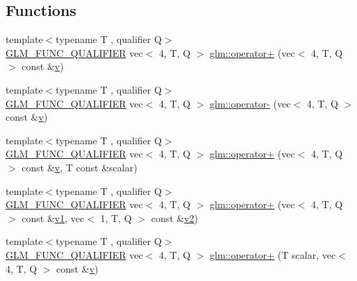 \subsection*{Functions}
\begin{DoxyCompactItemize}
\item 
{\footnotesize template$<$typename T , qualifier Q$>$ }\\\mbox{\hyperlink{setup_8hpp_a33fdea6f91c5f834105f7415e2a64407}{G\+L\+M\+\_\+\+F\+U\+N\+C\+\_\+\+Q\+U\+A\+L\+I\+F\+I\+ER}} vec$<$ 4, T, Q $>$ \mbox{\hyperlink{namespaceglm_ad4cb4de6123a192b6beac6bc1e2975d7}{glm\+::operator+}} (vec$<$ 4, T, Q $>$ const \&\mbox{\hyperlink{_s_d_l__opengl_8h_a10a82eabcb59d2fcd74acee063775f90}{v}})
\item 
{\footnotesize template$<$typename T , qualifier Q$>$ }\\\mbox{\hyperlink{setup_8hpp_a33fdea6f91c5f834105f7415e2a64407}{G\+L\+M\+\_\+\+F\+U\+N\+C\+\_\+\+Q\+U\+A\+L\+I\+F\+I\+ER}} vec$<$ 4, T, Q $>$ \mbox{\hyperlink{namespaceglm_a36a5075ce4b0b56798c9d28371a1422c}{glm\+::operator-\/}} (vec$<$ 4, T, Q $>$ const \&\mbox{\hyperlink{_s_d_l__opengl_8h_a10a82eabcb59d2fcd74acee063775f90}{v}})
\item 
{\footnotesize template$<$typename T , qualifier Q$>$ }\\\mbox{\hyperlink{setup_8hpp_a33fdea6f91c5f834105f7415e2a64407}{G\+L\+M\+\_\+\+F\+U\+N\+C\+\_\+\+Q\+U\+A\+L\+I\+F\+I\+ER}} vec$<$ 4, T, Q $>$ \mbox{\hyperlink{namespaceglm_a6181e788037278d6fd7f179ce6539551}{glm\+::operator+}} (vec$<$ 4, T, Q $>$ const \&\mbox{\hyperlink{_s_d_l__opengl_8h_a10a82eabcb59d2fcd74acee063775f90}{v}}, T const \&scalar)
\item 
{\footnotesize template$<$typename T , qualifier Q$>$ }\\\mbox{\hyperlink{setup_8hpp_a33fdea6f91c5f834105f7415e2a64407}{G\+L\+M\+\_\+\+F\+U\+N\+C\+\_\+\+Q\+U\+A\+L\+I\+F\+I\+ER}} vec$<$ 4, T, Q $>$ \mbox{\hyperlink{namespaceglm_af3516907770d4916d392ac513c906c4d}{glm\+::operator+}} (vec$<$ 4, T, Q $>$ const \&\mbox{\hyperlink{_s_d_l__opengl__glext_8h_a435c176a02c061b43e19bdf7c86cceae}{v1}}, vec$<$ 1, T, Q $>$ const \&\mbox{\hyperlink{_s_d_l__opengl__glext_8h_a0928f6d0f0f794ba000a21dfae422136}{v2}})
\item 
{\footnotesize template$<$typename T , qualifier Q$>$ }\\\mbox{\hyperlink{setup_8hpp_a33fdea6f91c5f834105f7415e2a64407}{G\+L\+M\+\_\+\+F\+U\+N\+C\+\_\+\+Q\+U\+A\+L\+I\+F\+I\+ER}} vec$<$ 4, T, Q $>$ \mbox{\hyperlink{namespaceglm_a773f02605265b58a81c2a51f80d25d54}{glm\+::operator+}} (T scalar, vec$<$ 4, T, Q $>$ const \&\mbox{\hyperlink{_s_d_l__opengl_8h_a10a82eabcb59d2fcd74acee063775f90}{v}})

\end{DoxyCompactItemize}
